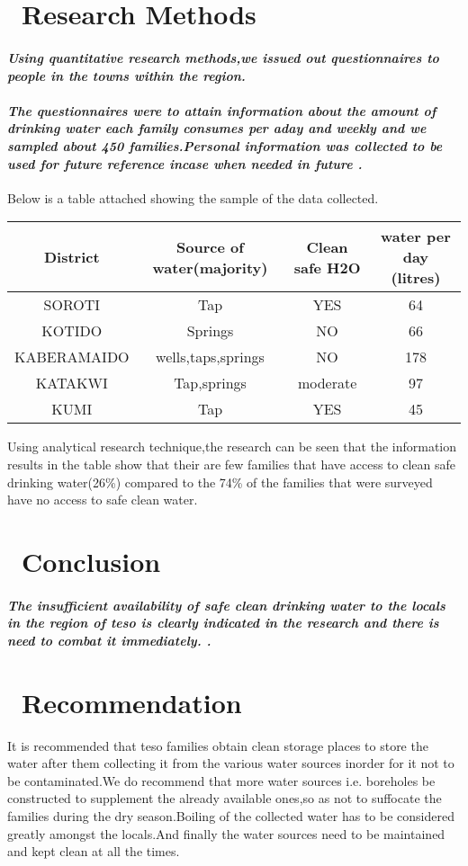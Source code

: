 \documentclass[a4paper,12pt]{article}
\begin{document}
\section{\  Research Methods}
\paragraph{ \sl Using quantitative research methods,we issued out questionnaires to people in the towns within the region.}
\paragraph{\sl  The questionnaires were to attain information about the amount of drinking water each family consumes per aday and weekly and we sampled about 450 families.Personal information was collected to be used for future reference incase when needed in future .}
Below is a table attached showing the sample of the data collected.
\begin{center}
\begin{tabular}{|c|c|c|c|}
\hline
District & Source of water(majority) & Clean safe H2O& water per day (litres) \\ [0.5ex]
\hline
SOROTI & Tap  & YES & 64\\ [0.5ex]
\hline
KOTIDO & Springs & NO & 66\\ [0.5ex]
\hline
KABERAMAIDO & wells,taps,springs & NO & 178\\ [0.5ex]
\hline
KATAKWI & Tap,springs & moderate & 97 \\ [0.5ex]
\hline
KUMI & Tap& YES & 45 \\ [0.5ex]
\hline
\end{tabular}
\end{center}
Using analytical research technique,the research can be seen that the information results in the table show that their are few families that have access to clean safe drinking water(26\%) compared to the 74\% of the families that were surveyed have no access to safe clean water.
\section{\  Conclusion}
\paragraph{\sl The insufficient availability of safe clean drinking water to the locals in the region of teso is clearly indicated in the research and there is need to combat it immediately.
.}



\section{\   Recommendation}
It is recommended that teso families obtain clean storage places to store the water after them collecting it from the various water sources inorder for it not to be contaminated.We do recommend that more water sources i.e. boreholes be constructed to supplement the already available ones,so as not to suffocate the families during the dry season.Boiling of the collected water has to be considered greatly amongst the locals.And finally the water sources need to be maintained and kept clean at all the times.
\end{document}
